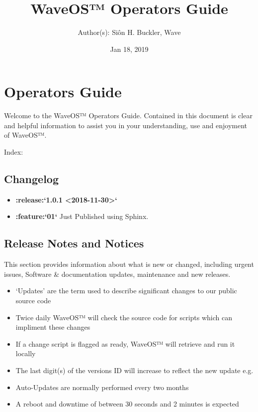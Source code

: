 \documentclass[letterpaper,10pt,english]{sphinxmanual}
\title{WaveOS™ Operators Guide}
\date{Jan 18, 2019}
\author{Author(s): Siôn H. Buckler, Wave}
\begin{document}
\maketitle
\sphinxtableofcontents
{}\label{\detokenize{index::doc}}



\chapter{Operators Guide}
\label{\detokenize{index:operators-guide}}
Welcome to the WaveOS™ Operators Guide. Contained in this document is clear and helpful information to assist you in your understanding, use and enjoyment of WaveOS™.

Index:


\section{Changelog}
\label{\detokenize{changelog:changelog}}\label{\detokenize{changelog::doc}}\begin{itemize}
\item {} 
{\color{red}\bfseries{}:release:{}`1.0.1 \textless{}2018-11-30\textgreater{}{}`}

\item {} 
{\color{red}\bfseries{}:feature:{}`01{}`} Just Published using Sphinx.

\end{itemize}


\section{Release Notes and Notices}
\label{\detokenize{releasenotes:release-notes-and-notices}}\label{\detokenize{releasenotes::doc}}
This section provides information about what is new or changed, including urgent issues, Software \& documentation updates, maintenance and new releases.
\begin{itemize}
\item {} 
‘Updates’ are the term used to describe significant changes to our public source code

\item {} 
Twice daily WaveOS™ will check the source code for scripts which can impliment these changes

\item {} 
If a change script is flagged as ready, WaveOS™ will retrieve and run it locally

\item {} 
The last digit(s) of the versions ID will increase to reflect the new update e.g. 

\item {} 
Auto-Updates are normally performed every two months

\item {} 
A reboot and downtime of between 30 seconds and 2 minutes is expected

\end{itemize}
\end{document}
